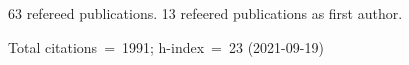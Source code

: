 63 refereed publications. 13 refeered publications as first author.

Total citations~=~1991; h-index~=~23 (2021-09-19)
